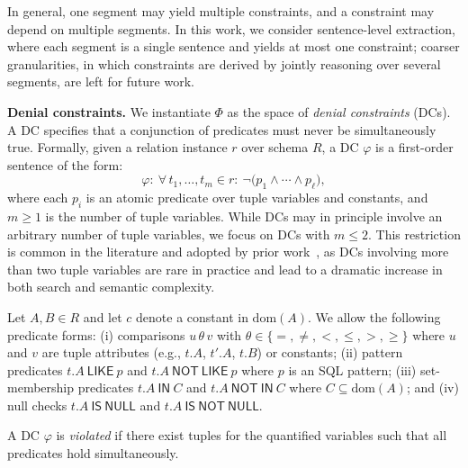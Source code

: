 
In general, one segment may yield multiple constraints, and a constraint may depend on multiple segments. In this work, we consider sentence-level extraction, where each segment is a single sentence and yields at most one constraint; coarser granularities, in which constraints are derived by jointly reasoning over several segments, are left for future work.


\smallskip\noindent\textbf{Denial constraints.}
We instantiate $\Phi$ as the space of \emph{denial constraints} (DCs). A DC specifies that a conjunction of predicates must never be simultaneously true. Formally, given a relation instance $r$ over schema $R$, a DC $\varphi$ is a first-order sentence of the form:
\[
\varphi:\ \forall\, t_1,\ldots,t_m \in r:\ \neg\big(p_1 \land \cdots \land p_\ell\big),
\]
where each $p_i$ is an atomic predicate over tuple variables and constants, and $m \ge 1$ is the number of tuple variables. While DCs may in principle involve an arbitrary number of tuple variables, we focus on DCs with $m \le 2$. This restriction is common in the literature and adopted by prior work~\cite{chu2013discovering,martin2025false, Pena2019DiscoveryDC}, as DCs involving more than two tuple variables are rare in practice and lead to a 
dramatic increase in both search and semantic complexity.


Let $A, B \in R$ and let $c$ denote a constant in $\mathrm{dom}(A)$. We allow the following predicate forms: (i) comparisons $u\,\theta\,v$ with $\theta \in \{=,\neq,<,\leq,>,\geq\}$ where $u$ and $v$ are tuple attributes (e.g., $t.A$, $t'.A$, $t.B$) or constants; (ii) pattern predicates $t.A\ \mathsf{LIKE}\ p$ and $t.A\ \mathsf{NOT\ LIKE}\ p$ where $p$ is an SQL pattern; (iii) set-membership predicates $t.A\ \mathsf{IN}\ C$ and $t.A\ \mathsf{NOT\ IN}\ C$ where $C \subseteq \mathrm{dom}(A)$; and
(iv) null checks $t.A\ \mathsf{IS\ NULL}$ and $t.A\ \mathsf{IS\ NOT\ NULL}$.

A DC $\varphi$ is \emph{violated} if there exist tuples for the quantified variables such that all predicates hold simultaneously.

